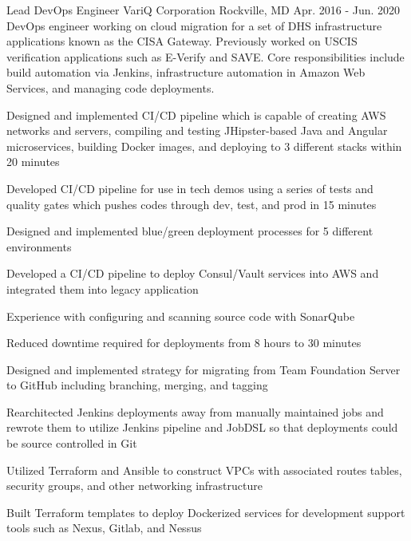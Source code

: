 \begin{cventries}
  \cventry
    {Lead DevOps Engineer} %
    {VariQ Corporation} %
    {Rockville, MD} %
    {Apr. 2016 - Jun. 2020} %
    {DevOps engineer working on cloud migration for a set of DHS infrastructure applications known as the CISA Gateway. Previously worked on USCIS verification applications such as E-Verify and SAVE. Core responsibilities include build automation via Jenkins, infrastructure automation in Amazon Web Services, and managing code deployments.} %
    {
      \begin{cvitems} %
        \item {Designed and implemented CI/CD pipeline which is capable of creating AWS networks and servers, compiling and testing JHipster-based Java and Angular microservices, building Docker images, and deploying to 3 different stacks within 20 minutes}
        \item {Developed CI/CD pipeline for use in tech demos using a series of tests and quality gates which pushes codes through dev, test, and prod in 15 minutes}
        \item {Designed and implemented blue/green deployment processes for 5 different environments}
        \item {Developed a CI/CD pipeline to deploy Consul/Vault services into AWS and integrated them into legacy application}
        \item {Experience with configuring and scanning source code with SonarQube}
        \item {Reduced downtime required for deployments from 8 hours to 30 minutes}
        \item {Designed and implemented strategy for migrating from Team Foundation Server to GitHub including branching, merging, and tagging}
        \item {Rearchitected Jenkins deployments away from manually maintained jobs and rewrote them to utilize Jenkins pipeline and JobDSL so that deployments could be source controlled in Git}
        \item {Utilized Terraform and Ansible to construct VPCs with associated routes tables, security groups, and other networking infrastructure}
        \item {Built Terraform templates to deploy Dockerized services for development support tools such as Nexus, Gitlab, and Nessus}

\end{cvitems}}
\end{cventries}
